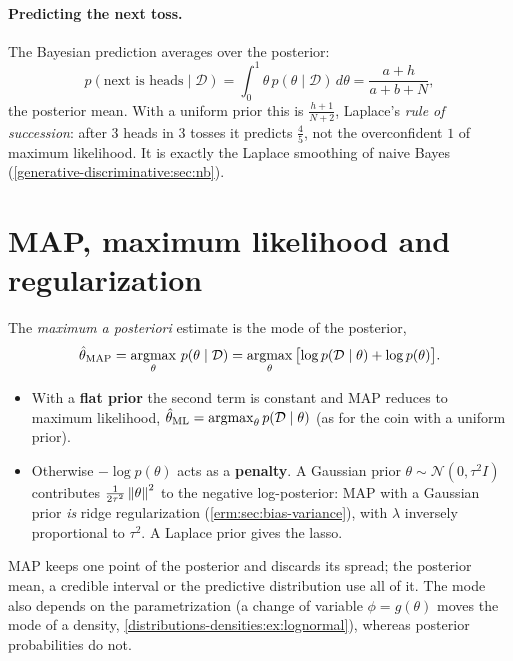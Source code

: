 \begin{notechapter}
\paragraph{Predicting the next toss.} The Bayesian prediction averages over the
posterior:
\[
  p(\text{next is heads}\mid\mathcal D) = \int_0^1\theta\,p(\theta\mid\mathcal D)\,d\theta
  = \frac{a + h}{a + b + N},
\]
the posterior mean. With a uniform prior this is $\frac{h+1}{N+2}$, Laplace's
\emph{rule of succession}: after $3$ heads in $3$ tosses it predicts $\frac45$,
not the overconfident $1$ of maximum likelihood. It is exactly the Laplace
smoothing of naive Bayes (\cref{generative-discriminative:sec:nb}).

\section{MAP, maximum likelihood and regularization}\label{bayesian-reasoning:sec:map}

\begin{definition}
The \emph{maximum a posteriori} estimate is the mode of the posterior,
\[
  \hat\theta_{\mathrm{MAP}} = \operatorname*{argmax}_\theta\,p(\theta\mid\mathcal D)
  = \operatorname*{argmax}_\theta\,\bigl[\log p(\mathcal D\mid\theta) + \log p(\theta)\bigr].
\]
\end{definition}

\begin{itemize}
  \item With a \textbf{flat prior} the second term is constant and MAP reduces to
        maximum likelihood, $\hat\theta_{\mathrm{ML}} = \operatorname*{argmax}_\theta p(\mathcal D\mid\theta)$
        (as for the coin with a uniform prior).
  \item Otherwise $-\log p(\theta)$ acts as a \textbf{penalty}. A Gaussian prior
        $\theta\sim\mathcal N(0,\tau^2I)$ contributes $\frac{1}{2\tau^2}\left\|\theta\right\|^2$ to
        the negative log-posterior: MAP with a Gaussian prior \emph{is} ridge
        regularization (\cref{erm:sec:bias-variance}), with $\lambda$ inversely
        proportional to $\tau^2$. A Laplace prior gives the lasso.
\end{itemize}

\begin{pitfall}
MAP keeps one point of the posterior and discards its spread; the posterior
mean, a credible interval or the predictive distribution use all of it. The mode
also depends on the parametrization (a change of variable $\phi = g(\theta)$ moves
the mode of a density, \cref{distributions-densities:ex:lognormal}), whereas posterior probabilities do not.
\end{pitfall}


\end{notechapter}
